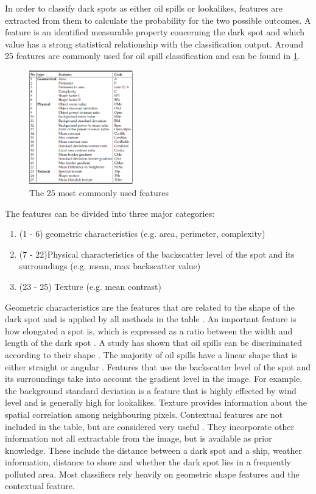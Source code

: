 In order to classify dark spots as either oil spills or lookalikes, features are extracted from them to calculate the probability for the two possible outcomes. A feature is an identified measurable property concerning the dark spot and which value has a strong statistical relationship with the classification output. Around 25 features are commonly used for oil spill classification and can be found in \ref{fig:featuretable}.

\begin{figure}[H]
	\centering
    \includegraphics[width=0.4\textwidth]{./img/featurestable.png}
    \caption{\footnotesize{The 25 most commonly used features\cite{Topouzelis201268}}}
    \label{fig:featuretable}
\end{figure}

The features can be divided into three major categories\cite{Brekke200595}:
\begin{enumerate}
\item (1 - 6) geometric characteristics (e.g. area, perimeter, complexity)
\item (7 - 22)Physical characteristics of the backscatter level of the spot and its surroundings (e.g. mean, max backscatter value)
\item (23 - 25) Texture (e.g. mean contrast)
\end{enumerate}

Geometric characteristics are the features that are related to the shape of the dark spot and is applied by all methods in the table \cite{Topouzelis200930}. An important feature is how elongated a spot is, which is expressed as a ratio between the width and length of the dark spot \cite{Gasull20071}. A study has shown that oil spills can be discriminated according to their shape \cite{Guo2014146}. The majority of oil spills have a linear shape that is either straight or angular \cite{Pavlakis200156}. Features that use the backscatter level of the spot and its surroundings take into account the gradient level in the image. For example, the background standard deviation is a feature that is highly effected by wind level and is generally high for lookalikes. Texture provides information about the spatial correlation among neighbouring pixels. Contextual features are not included in the table, but are considered very useful \cite{Topouzelis200930}. They incorporate other information not all extractable from the image, but is available as prior knowledge. These include the distance between a dark spot and a ship, weather information, distance to shore and whether the dark spot lies in a frequently polluted area. Most classifiers rely heavily on geometric shape features and the contextual feature. \cite{Xu201414}

